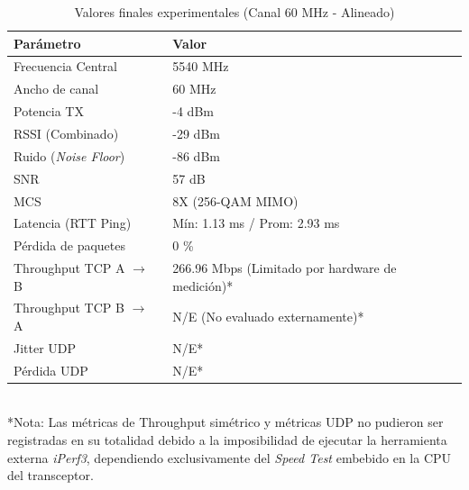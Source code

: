 \begin{table}[htbp]
\centering
\caption{Valores finales experimentales (Canal 60 MHz - Alineado)}
\label{tab:resultados_finales}
\begin{tabular}{|l|l|}
\hline
\textbf{Parámetro} & \textbf{Valor} \\ \hline
Frecuencia Central & 5540 MHz \\ \hline
Ancho de canal & 60 MHz \\ \hline
Potencia TX & -4 dBm \\ \hline
RSSI (Combinado) & -29 dBm \\ \hline
Ruido (\textit{Noise Floor}) & -86 dBm \\ \hline
SNR & 57 dB \\ \hline
MCS & 8X (256-QAM MIMO) \\ \hline
Latencia (RTT Ping) & Mín: 1.13 ms / Prom: 2.93 ms \\ \hline
Pérdida de paquetes & 0 \% \\ \hline
Throughput TCP A $\rightarrow$ B & 266.96 Mbps (Limitado por hardware de medición)* \\ \hline
Throughput TCP B $\rightarrow$ A & N/E (No evaluado externamente)* \\ \hline
Jitter UDP & N/E* \\ \hline
Pérdida UDP & N/E* \\ \hline
\end{tabular}
\\ \vspace{0.2cm}
\footnotesize{*Nota: Las métricas de Throughput simétrico y métricas UDP no pudieron ser registradas en su totalidad debido a la imposibilidad de ejecutar la herramienta externa \textit{iPerf3}, dependiendo exclusivamente del \textit{Speed Test} embebido en la CPU del transceptor.}
\end{table}

